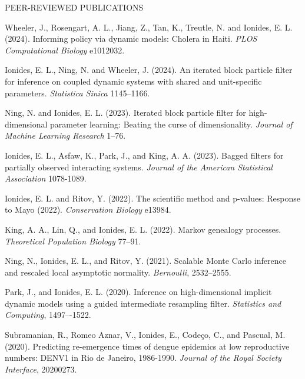 \begin{reflist}{PEER-REVIEWED PUBLICATIONS}
\item Wheeler, J., Rosengart, A. L., Jiang, Z., Tan, K., Treutle, 
  N. and Ionides, E. L. (2024). Informing policy via dynamic models: Cholera in Haiti. {\it PLOS Computational Biology} {}{\separator}e1012032.

\item Ionides, E. L., Ning, N. and Wheeler, J. (2024). An iterated block particle filter for inference on coupled dynamic systems with shared and unit-specific parameters. {\it Statistica Sinica} {}{\separator}1145--1166.

  \item Ning, N. and Ionides, E. L. (2023). Iterated block particle filter for high-dimensional parameter learning: Beating the curse of dimensionality. {\it Journal of Machine Learning Research} {}{\separator}1--76.

    \item  Ionides, E. L., Asfaw, K., Park, J., and King, A. A. (2023). Bagged filters for partially observed interacting systems. {\em Journal of the American Statistical Association} {}{\separator}1078-1089. 


\item Ionides, E. L. and Ritov, Y. (2022). The scientific method and p-values: Response to Mayo (2022). {\em Conservation Biology} {}{\separator}e13984.

\item  King, A. A., Lin, Q., and Ionides, E. L. (2022). Markov genealogy processes. {\em Theoretical Population Biology} {}{\separator}77--91.
  
\item Ning, N., Ionides, E. L., and Ritov, Y. (2021). Scalable Monte Carlo inference and rescaled local asymptotic normality. {\em Bernoulli}, {}{\separator}2532--2555.
  
  \item Park, J., and Ionides, E. L. (2020). Inference on high-dimensional implicit dynamic models using a guided intermediate resampling filter. {\em Statistics and Computing}, {}{\separator}1497–-1522.

\item Subramanian, R., Romeo Aznar, V., Ionides, E., Code{\c c}o, C., and Pascual, M. (2020). Predicting re-emergence times of dengue epidemics at low reproductive numbers: DENV1 in Rio de Janeiro, 1986-1990. {\em Journal of the Royal Society Interface}, {}{\separator}20200273. 


\end{reflist}

